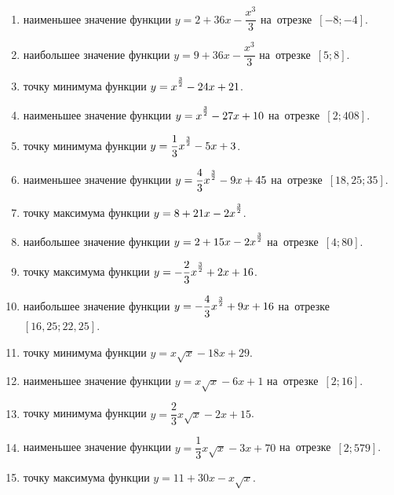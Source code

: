 \documentclass[a4paper,10pt]{article}
\begin{document}
\begin{enumerate}
\item {} наименьшее значение функции $y=2 +36x-\dfrac{x^3}{3}$ на~отрезке~$\left[-8;-4\right]$.

\item {} наибольшее значение функции $y=9 +36x-\dfrac{x^3}{3}$ на~отрезке~$\left[5;8\right]$.

\item {} точку минимума функции $y=x\strut^{\frac{3}{2}} -24x+21$.

\item {} наименьшее значение функции $y=x\strut^{\frac{3}{2}} -27x+10$ на~отрезке~$\left[2;408\right]$.

\item {} точку минимума функции $y=\dfrac{1}{3}x\strut^{\frac{3}{2}} -5x+3$.

\item {} наименьшее значение функции $y=\dfrac{4}{3}x\strut^{\frac{3}{2}} -9x+45$ на~отрезке~$\left[18,25;35\right]$.

\item {} точку максимума функции $y=8+21x-2x\strut^{\frac{3}{2}}$.

\item {} наибольшее значение функции $y=2+15x-2x\strut^{\frac{3}{2}}$ на~отрезке~$\left[4;80\right]$.

\item {} точку максимума функции $y=-\dfrac{2}{3}x\strut^{\frac{3}{2}} +2x+16$.

\item {} наибольшее значение функции $y=-\dfrac{4}{3}x\strut^{\frac{3}{2}} +9x+16$ на~отрезке~$\left[16,25;22,25\right]$.

\item {} точку минимума функции $y=x\sqrt{x} -18x+29$.

\item {} наименьшее значение функции $y=x\sqrt{x} -6x+1$ на~отрезке~$\left[2;16\right]$.

\item {} точку минимума функции $y=\dfrac{2}{3}x\sqrt{x} -2x+15$.

\item {} наименьшее значение функции $y=\dfrac{1}{3}x\sqrt{x} -3x+70$ на~отрезке~$\left[2;579\right]$.

\item {} точку максимума функции $y=11+30x -x\sqrt{x}$.


\end{enumerate}
\end{document}
